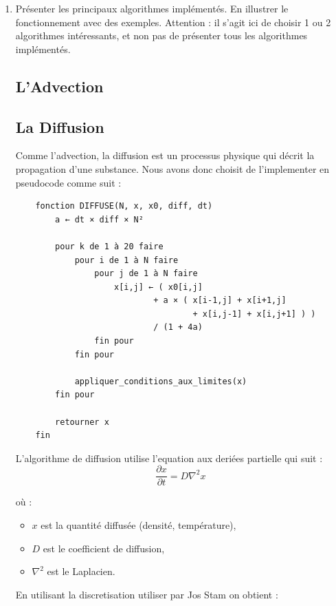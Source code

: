 \documentclass[a4paper]{article}
\begin{document}
\begin{enumerate}%
\item Présenter les principaux algorithmes implémentés. En illustrer le fonctionnement avec des exemples. Attention : il s'agit ici de choisir 1 ou 2 algorithmes intéressants, et non pas de présenter tous les algorithmes implémentés.

    \subsection*{L'Advection}
    \subsection*{La Diffusion}
    {\color{WildStrawberry}
    Comme l'advection, la diffusion est un processus physique qui décrit la propagation d'une substance.
    Nous avons donc choisit de l'implementer en pseudocode comme suit :

    \begin{verbatim}
    fonction DIFFUSE(N, x, x0, diff, dt)
        a ← dt × diff × N²

        pour k de 1 à 20 faire
            pour i de 1 à N faire
                pour j de 1 à N faire
                    x[i,j] ← ( x0[i,j]
                            + a × ( x[i-1,j] + x[i+1,j]
                                    + x[i,j-1] + x[i,j+1] ) )
                            / (1 + 4a)
                fin pour
            fin pour

            appliquer_conditions_aux_limites(x)
        fin pour

        retourner x
    fin 
    \end{verbatim}

    L'algorithme de diffusion utilise l'equation aux deriées partielle
    qui suit :
    \begin{equation*}
    \frac{\partial x}{\partial t} = D \nabla^2 x
    \end{equation*}

    où :
    \begin{itemize}
        \item $x$ est la quantité diffusée (densité, température),
        \item $D$ est le coefficient de diffusion,
        \item $\nabla^2$ est le Laplacien.
    \end{itemize}

    En utilisant la discretisation utiliser par Jos Stam on obtient :

}
\end{enumerate}
\end{document}
